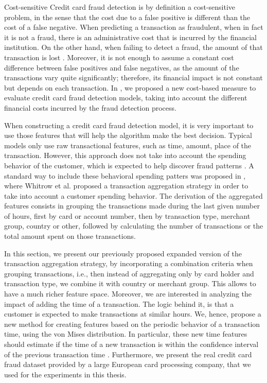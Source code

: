 	\begin{remark}{Cost-sensitive}
  Credit card fraud detection is by definition a cost-sensitive problem, in the sense that the 
  cost  due to a false positive is different than the cost of a false negative. When predicting a   
  transaction   as fraudulent, when in fact it is not a fraud, there is an administrative cost that 
  is incurred by  the financial institution. On the other hand, when failing to detect a fraud, the 
  amount of that  transaction is lost \citep{Hand2007a}. Moreover, it is not enough  to assume a  
  constant cost   difference between false positives and false negatives, as the amount of the  
  transactions vary   quite significantly; therefore, its financial impact is not constant but  
  depends on each   transaction.  In \citep{CorreaBahnsen2013}, we proposed a new cost-based 
  measure to evaluate   credit card fraud detection models, taking into account the different 
  financial costs incurred by   the fraud detection process.
	\end{remark}
	
  When constructing a credit card fraud detection model, it is very important to use those features 
  that will help the algorithm make the best decision. Typical models only use raw transactional 
  features, such as time, amount, place of the transaction. However, this approach does not take 
  into account the spending behavior of the customer, which is expected to help discover fraud 
  patterns \citep{Gadi2008}. A standard way to include these behavioral spending patters was 
  proposed in \citep{Whitrow2008}, where Whitrow et al. proposed a transaction aggregation strategy 
  in order to take   into account a customer spending behavior. The derivation of the aggregated 
  features consists in grouping the transactions made during the last given number of hours, first 
  by card or account number, then by transaction type, merchant group, country or other, followed 
  by calculating  the number of transactions or the total amount spent on those transactions.
	
	In this section, we present our previously proposed expanded version of the transaction 
  aggregation strategy, by  incorporating a combination criteria when grouping transactions, i.e., 
  then instead of aggregating only  by card holder and transaction type, we combine it with 
  country or merchant group. This allows to have a much richer feature space. Moreover, we are 
  interested in analyzing the impact of adding the time of a transaction. The logic behind it, is 
  that a customer is expected to make transactions at similar hours. We, hence, propose a new 
  method for creating features  based on the  periodic behavior of a transaction time, using the 
  von Mises distribution. In particular, these new time features should estimate if the time of a 
  new transaction is within the confidence interval of the  previous transaction time
  \citep{CorreaBahnsen2015c}. Furthermore, we present the real credit card fraud dataset provided 
  by a large European card processing company, that we used for the experiments in this thesis.
  
